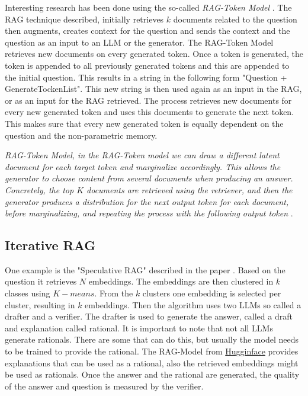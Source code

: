 \documentclass{wseas}
\begin{document}
Interesting research has been done using the so-called \emph{RAG-Token
Model} \cite{Retrieval_Augmented_Generation_(RAG)_Explained_Understanding_Key_Concepts}. The RAG technique described, initially retrieves \(k\) documents
related to the question then augments, creates context for the question and
sends the context and the question as an input to an LLM or the
generator. The RAG-Token Model retrieves new documents on every
generated token. Once a token is generated, the token is appended to all
previously generated tokens and this are appended to the initial
question. This results in a string in the following form "Question +
GenerateTockenList". This new string is then used again as an input in
the RAG, or as an input for the RAG retrieved. The process retrieves new
documents for every new generated token and uses this documents to
generate the next token. This makes sure that every new generated token
is equally dependent on the question and the non-parametric memory.

\emph{RAG-Token Model, in the RAG-Token model we can draw a different
latent document for each target token and marginalize accordingly. This
allows the generator to choose content from several documents when
producing an answer. Concretely, the top $K$ documents are retrieved using
the retriever, and then the generator produces a distribution for the
next output token for each document, before marginalizing, and repeating
the process with the following output token}
\cite{Retrieval_Augmented_Generation_(RAG)_Explained_Understanding_Key_Concepts}.

\subsection{Iterative RAG}

One example is the "Speculative RAG" described in the paper \cite{SpeculativeRAG_EnhancingRetrieval-AugmentedGenerationThroughDrafting}. 
Based on the question it retrieves \(N\) embeddings. The
embeddings are then clustered in \(k\) classes using $K-means$. From the
\(k\) clusters one embedding is selected per cluster, resulting in $k$
embeddings. Then the algorithm uses two LLMs so called a drafter and a
verifier. The drafter is used to generate the answer, called a draft and
explanation called rational. It is important to note that not all LLMs
generate rationals. There are some that can do this, but usually the
model needs to be trained to provide the rational. The RAG-Model from
\href{https://huggingface.co/}{Hugginface} provides explanations that 
can be used as a rational, also the retrieved embeddings might be used 
as rationals. Once the answer and the rational are generated, the quality 
of the answer and question is measured by the verifier.
\end{document}
